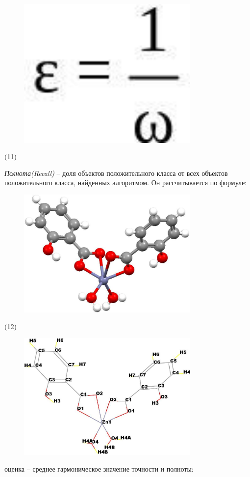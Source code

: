 \begin{figure}[H]
	\centering
	\includegraphics[width=0.8\textwidth]{assets/36}
	\caption*{}
\end{figure} (11)

\emph{Полнота(Recall)} -- доля объектов положительного класса от всех
объектов положительного класса, найденных алгоритмом. Он рассчитывается
по формуле:

\begin{figure}[H]
	\centering
	\includegraphics[width=0.8\textwidth]{assets/37}
	\caption*{}
\end{figure} (12)

\begin{figure}[H]
	\centering
	\includegraphics[width=0.8\textwidth]{assets/38}
	\caption*{}
\end{figure}оценка -- среднее гармоническое
значение точности и полноты:

